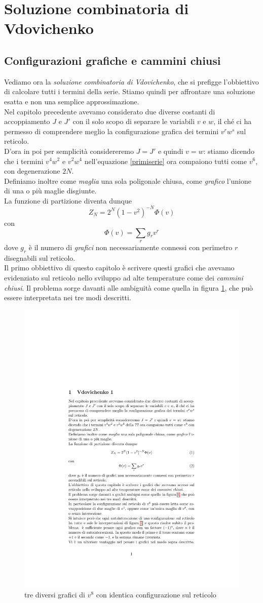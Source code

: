 \documentclass[11pt]{article}
\begin{document}
\section{Soluzione combinatoria di Vdovichenko}
\subsection{Configurazioni grafiche e cammini chiusi}

Vediamo ora la \emph{soluzione combinatoria di Vdovichenko}, che si prefigge l'obbiettivo di calcolare tutti i termini della serie. Stiamo quindi per affrontare una soluzione esatta e non una semplice approssimazione.\\
Nel capitolo precedente avevamo considerato due diverse costanti di accoppiamento $J$ e $J'$ con il solo scopo di separare le variabili $v$ e $w$, il ché ci ha permesso di comprendere meglio la configurazione grafica dei termini $v^rw^s$ sul reticolo.\\
D'ora in poi per semplicità considereremo $J=J'$ e quindi $v=w$: stiamo dicendo che i termini $v^4w^2$ e $v^2w^4$ nell'equazione \ref{primiserie} ora compaiono tutti come $v^6$, con degenerazione $2N$. \\
Definiamo inoltre come \emph{maglia} una sola poligonale chiusa, come \emph{grafico} l'unione di una o più maglie disgiunte.  \\
La funzione di partizione diventa dunque
\begin{equation}\label{enlib}
Z_N=2^N(1-v^2)^{-N}\Phi(v)
\end{equation}
con 
\begin{equation}
\Phi(v)= \sum_r g_r v^r
\end{equation}
dove $g_r$ è il numero di \emph{grafici} non necessariamente connessi con perimetro $r$ disegnabili sul reticolo. \\
Il primo obbiettivo di questo capitolo è scrivere questi grafici che avevamo evidenziato sul reticolo nello sviluppo ad alte temperature come dei \emph{cammini chiusi}.
Il problema sorge davanti alle ambiguità come quella in figura \ref{v1}, che può essere interpretata nei tre modi descritti.
\begin{figure}[h]
\centering
\includegraphics[width=0.5\columnwidth]{v1}
\caption{tre diversi grafici di $v^8$ con identica configurazione sul reticolo}
\label{v1}
\end{figure}
\end{document}
